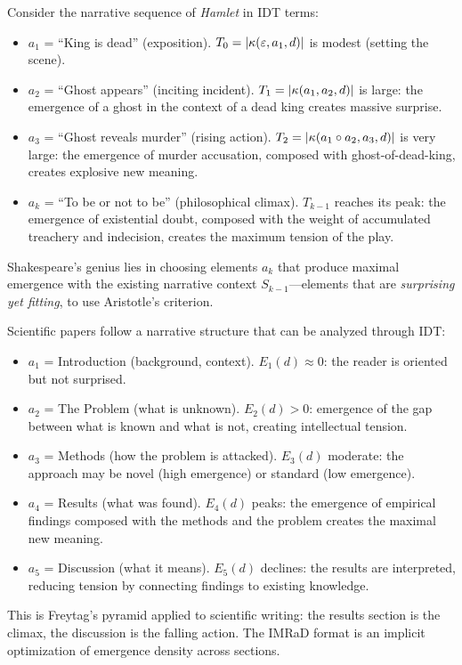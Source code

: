 \begin{example}
\label{ex:hamlet}
Consider the narrative sequence of \emph{Hamlet} in IDT terms:
\begin{itemize}
  \item $a_1$ = ``King is dead'' (exposition).
        $T_0 = |\kappa(\varepsilon, a_1, d)|$ is modest (setting the scene).
  \item $a_2$ = ``Ghost appears'' (inciting incident).
        $T_1 = |\kappa(a_1, a_2, d)|$ is large: the emergence of a ghost
        in the context of a dead king creates massive surprise.
  \item $a_3$ = ``Ghost reveals murder'' (rising action).
        $T_2 = |\kappa(a_1 \circ a_2, a_3, d)|$ is very large: the
        emergence of murder accusation, composed with ghost-of-dead-king,
        creates explosive new meaning.
  \item $a_k$ = ``To be or not to be'' (philosophical climax).
        $T_{k-1}$ reaches its peak: the emergence of existential doubt,
        composed with the weight of accumulated treachery and indecision,
        creates the maximum tension of the play.
\end{itemize}
Shakespeare's genius lies in choosing elements $a_k$ that produce maximal
emergence with the existing narrative context $S_{k-1}$---elements that are
\emph{surprising yet fitting}, to use Aristotle's criterion.
\end{example}

\begin{example}
\label{ex:scientific-narrative}
Scientific papers follow a narrative structure that can be analyzed through
IDT:
\begin{itemize}
  \item $a_1$ = Introduction (background, context).
        $E_1(d) \approx 0$: the reader is oriented but not surprised.
  \item $a_2$ = The Problem (what is unknown).
        $E_2(d) > 0$: emergence of the gap between what is known and what is
        not, creating intellectual tension.
  \item $a_3$ = Methods (how the problem is attacked).
        $E_3(d)$ moderate: the approach may be novel (high emergence) or
        standard (low emergence).
  \item $a_4$ = Results (what was found).
        $E_4(d)$ peaks: the emergence of empirical findings composed with the
        methods and the problem creates the maximal new meaning.
  \item $a_5$ = Discussion (what it means).
        $E_5(d)$ declines: the results are interpreted, reducing tension by
        connecting findings to existing knowledge.
\end{itemize}
This is Freytag's pyramid applied to scientific writing: the results section
is the climax, the discussion is the falling action.  The IMRaD format is an
implicit optimization of emergence density across sections.
\end{example}

